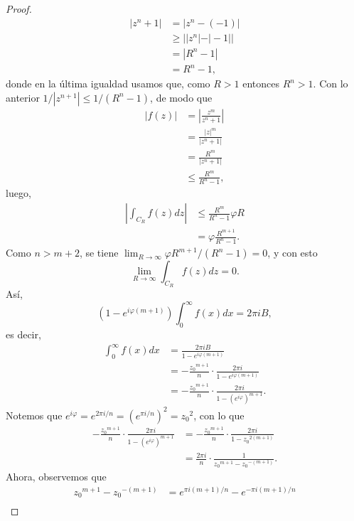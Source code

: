 \begin{proof}
$$\begin{aligned}
      |z^n+1|&=|z^n-(-1)|\\
             &\geq||z^n|-|-1||\\
             &=|R^n-1|\\
             &=R^n-1,
   \end{aligned}
   $$
   donde en la última igualdad usamos que, como $R>1$ entonces $R^n>1$. Con lo anterior $1/|z^{n+1}|\leq 1/(R^n-1)$, de modo que
   $$
   \begin{aligned}
      |f(z)|&=\left|\frac{z^m}{z^n+1}\right|\\
            &=\frac{|z|^m}{|z^n+1|}\\
            &=\frac{R^m}{|z^n+1|}\\
            &\leq\frac{R^m}{R^n-1},
   \end{aligned}
   $$
   luego,
   $$
   \begin{aligned}
      \left|\int_{C_R}f(z)dz\right|&\leq \frac{R^m}{R^n-1}\varphi R\\
                                   &=\varphi \frac{R^{m+1}}{R^n-1}.
   \end{aligned}
   $$
   Como $n>m+2$, se tiene $\lim_{R\to\infty} \varphi R^{m+1}/(R^n-1)=0$, y con esto
   $$
   \lim_{R\to\infty}\int_{C_R}f(z)dz=0.
   $$
   Así,
   $$
   \left( 1-e^{i\varphi(m+1)}\right)\int_{0}^{\infty}f(x)dx=2\pi i B,
   $$
   es decir,
   $$
   \begin{aligned}
      \int_{0}^{\infty}f(x)dx&=\frac{2\pi i B}{1-e^{i\varphi(m+1)}}\\
                             &=-\frac{{z_0}^{m+1}}{n}\cdot\frac{2\pi i}{1-e^{i\varphi(m+1)}}\\
                             &=-\frac{{z_0}^{m+1}}{n}\cdot\frac{2\pi i}{1-\left( e^{i\varphi}\right)^{m+1}}.
   \end{aligned}
   $$
   Notemos que $e^{i\varphi}=e^{2\pi i/n}=\left( e^{\pi i/n}\right)^2={z_0}^2$, con lo que
   $$
   \begin{aligned}
      -\frac{{z_0}^{m+1}}{n}\cdot\frac{2\pi i}{1-\left( e^{i\varphi}\right)^{m+1}}&=-\frac{{z_0}^{m+1}}{n}\cdot\frac{2\pi i}{1-{z_0}^{2(m+1)}}\\
                                                                                  &=\frac{2\pi i}{n}\cdot\frac{1}{{z_0}^{m+1}-{z_0}^{-(m+1)}}.
   \end{aligned}
   $$
   Ahora, observemos que
   $$
   \begin{aligned}
      {z_0}^{m+1}-{z_0}^{-(m+1)}&=e^{\pi i(m+1)/n}-e^{-\pi i(m+1)/n}\\

\end{aligned}$$
\end{proof}
